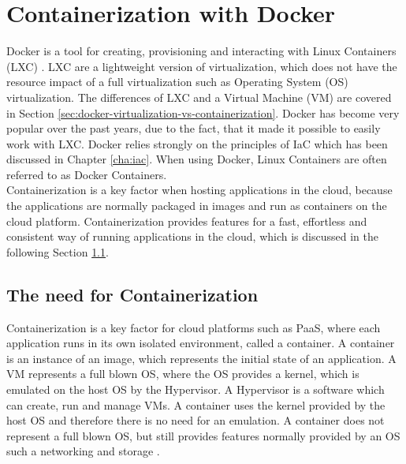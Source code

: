 \chapter{Containerization with Docker}
\label{cha:containerization-docker}
Docker is a tool for creating, provisioning and interacting with Linux Containers (LXC) \cite{Docker2018,LXC2018}. LXC are a lightweight version of virtualization, which does not have the resource impact of a full virtualization such as Operating System (OS) virtualization. The differences of LXC and a Virtual Machine (VM) are covered in Section \ref{sec:docker-virtualization-vs-containerization}. Docker has become very popular over the past years, due to the fact, that it made it possible to easily work with LXC. Docker relies strongly on the principles of IaC which has been discussed in Chapter \ref{cha:iac}. When using Docker, Linux Containers are often referred to as Docker Containers. \\

Containerization is a key factor when hosting applications in the cloud, because the applications are normally packaged in images and run as containers on the cloud platform. Containerization provides features for a fast, effortless and consistent way of running applications in the cloud, which is discussed in the following Section \ref{sec:docker-need-for-containerization}.

\section{The need for Containerization}
\label{sec:docker-need-for-containerization}
Containerization is a key factor for cloud platforms such as PaaS, where each application runs in its own isolated environment, called a container. A container is an instance of an image, which represents the initial state of an application. A VM represents a full blown OS, where the OS provides a kernel, which is emulated on the host OS by the Hypervisor. A Hypervisor is a software which can create, run and manage VMs. A container uses the kernel provided by the host OS and therefore there is no need for an emulation. A container does not represent a full blown OS, but still provides features normally provided by an OS such a networking and storage \cite{DockerVirtScheepers2014}. \\ 

